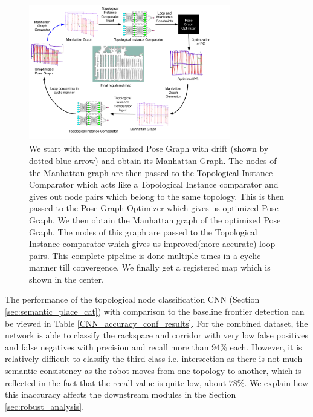 \documentclass[letterpaper, 10 pt, conference]{ieeeconf}  %
\begin{document}
	\begin{figure}[!htbp]
		\includegraphics[width=8.8cm,height=6cm]{pic/algorithm_optimization.png}
		\caption{We start with the unoptimized Pose Graph with drift (shown by dotted-blue arrow) and obtain its Manhattan Graph. The nodes of the Manhattan graph are then passed to the Topological Instance Comparator which acts like a Topological Instance comparator and gives out node pairs which belong to the same topology. This is then passed to the Pose Graph Optimizer which gives us optimized Pose Graph. We then obtain the Manhattan graph of the optimized Pose Graph. The nodes of this graph are passed to the Topological Instance comparator which gives us improved(more accurate) loop pairs. This complete pipeline is done multiple times in a cyclic manner till convergence. We finally get a registered map which is shown in the center.}
		\label{fig:Posegraph Optimization pipeline}
	\end{figure}
	
	The performance of the topological node classification CNN (Section \ref{sec:semantic_place_cat}) with comparison to the baseline frontier detection can be viewed in Table \ref{CNN_accuracy_conf_results}. For the combined dataset, the network is able to classify the rackspace and corridor with very low false positives and false negatives with precision and recall more than $94 \%$ each. However, it is relatively difficult to classify the third class i.e. intersection as there is not much semantic consistency as the robot moves from one topology to another, which is reflected in the fact that the recall value is quite low, about $78 \% $. We explain how this inaccuracy affects the downstream modules in the Section \ref{sec:robust_analysis}.
	
\end{document}
